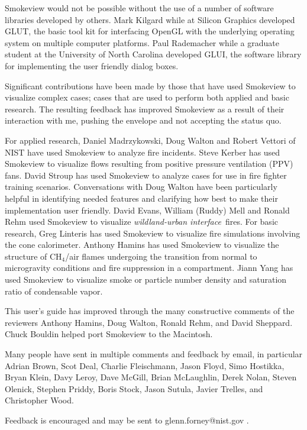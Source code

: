 \documentclass[11pt,twoside]{book}
\begin{document}
Smokeview would not be possible without the use of a number of
software libraries developed by others.  Mark Kilgard while at
Silicon Graphics developed GLUT, the basic tool kit for
interfacing OpenGL with the underlying operating system on
multiple computer platforms. Paul Rademacher while a graduate
student at the University of North Carolina developed GLUI, the
software library for implementing the user friendly dialog boxes.

Significant contributions have been made by those that have used
Smokeview to visualize complex cases; cases that are used to
perform both applied and basic research.  The resulting feedback
has improved Smokeview as a result of their interaction with me,
pushing the envelope and not accepting the status quo.

For applied research, Daniel Madrzykowski, Doug Walton and Robert
Vettori of NIST have used Smokeview to analyze fire incidents.
Steve Kerber has used Smokeview to visualize flows resulting from
positive pressure ventilation (PPV) fans. David Stroup has used
Smokeview to analyze cases for use in fire fighter training
scenarios.  Conversations with Doug Walton have been particularly
helpful in identifying needed features and clarifying how best to
make their implementation user friendly.  David Evans, William
(Ruddy) Mell and Ronald Rehm used Smokeview to visualize {\em
wildland-urban interface}\ fires.   For basic research, Greg
Linteris has used Smokeview to visualize fire simulations
involving the cone calorimeter. Anthony Hamins has used Smokeview
to visualize the structure of CH$_4$/air flames undergoing the
transition from normal to microgravity conditions and fire
suppression in a compartment. Jiann Yang has used Smokeview to
visualize smoke or particle number density and saturation ratio of
condensable vapor.

This user's guide has improved through the many constructive
comments of the reviewers Anthony Hamins, Doug Walton, Ronald
Rehm, and David Sheppard. Chuck Bouldin helped port Smokeview to
the Macintosh.

Many people have sent in multiple comments and feedback by email,
in particular Adrian Brown, Scot Deal, Charlie Fleischmann, Jason
Floyd, Simo Hostikka, Bryan Klein, Davy Leroy, Dave McGill, Brian
McLaughlin, Derek Nolan, Steven Olenick, Stephen Priddy, Boris
Stock, Jason Sutula, Javier Trelles, and Christopher Wood.

Feedback is encouraged and may be sent to glenn.forney@nist.gov .
\end{document}
